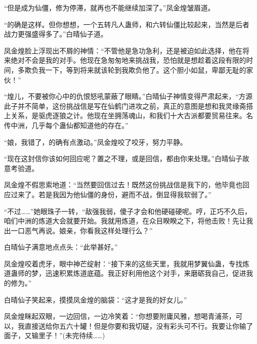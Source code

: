 \begin{this_body}
“但是成为仙僵，修为停滞，就再也不能继续加深了。”凤金煌皱眉道。

“的确是这样。但你想想，一个五转凡人蛊师，和六转仙僵比较起来，当然是后者战力更强盛得多了。”白晴仙子道。

凤金煌脸上浮现出不屑的神情：“不管他是急功急利，还是被迫如此选择，他在将来绝对不会是我的对手。他现在急匆匆地来挑战我，恐怕就是想趁着这段有限的时间，多欺负我一下，等到将来就该轮到我欺负他了。这个胆小如鼠，卑鄙无耻的家伙！”

“煌儿，不要被你心中的仇恨怒吼蒙蔽了眼睛。”白晴仙子神情变得严肃起来，“方源此子并不简单，这份挑战信是写在仙鹤门进攻之前，真正的意图是想和我灵缘斋搭上关系，是驱虎逐狼之计。他现在坐拥荡魂山，和我们十大古派都要贸易往来。名传中洲，几乎每个蛊仙都知道他的存在。”

“娘，我错了，的确有点激动。”凤金煌咬了咬牙，努力平静。

“现在这封信你该如何回应呢？置之不理，或是回信，都由你来处理。”白晴仙子故意考验道。

凤金煌不假思索地道：“当然要回信过去！既然这份挑战信是我下的，他毕竟也回应过来了。若是我因为他仙僵的身份，避而不战，倒显得我软弱了。”

“不过……”她眼珠子一转，“敌强我弱，傻子才会和他硬碰硬呢。哼，正巧不久后，咱们中洲的炼道大会就要开始。我就用炼道，在众目睽睽之下，将他击败！先让我出一口恶气再说。娘亲，你看我这样处理行么？”

白晴仙子满意地点点头：“此举甚好。”

凤金煌咬着虎牙，眼中神芒绽射：“接下来的这些天里，我就用梦翼仙蛊，专找炼道蛊师的梦，迅速积累炼道底蕴。我正好利用他这个对手，来磨砺我自己，促进我的修为。”

白晴仙子笑起来，摸摸凤金煌的脑袋：“这才是我的好女儿。”

凤金煌眯起双眼，一边回信，一边冷笑着：“你想要附庸风雅，想喝青浦茶，可以，我直接送给你五六十罐！但是你要和我切磋，没有彩头可不行。我要让你输了面子，又输里子！”(未完待续……)

\end{this_body}

